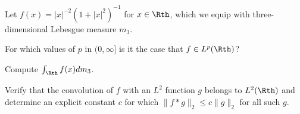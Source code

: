 Let $f(x)=|x|^{-2}(1+|x|^2)^{-1}$ for $x\in \Rth$, which we equip with
three-dimensional Lebesgue measure $m_3$.
\begin{alist}
\item For which values of $p$ in $(0,\infty]$ is it the case that
$f\in L^p(\Rth)$?
\item Compute $\int_{\Rth}f(x)dm_3$.
\item Verify that the convolution of $f$ with an $L^2$ function
$g$ belongs to $L^2(\Rth)$ and determine an explicit constant $c$ for
which $\|f\ast g\|_2\leq c\|g\|_2$ for all such $g$.

\end{alist}

